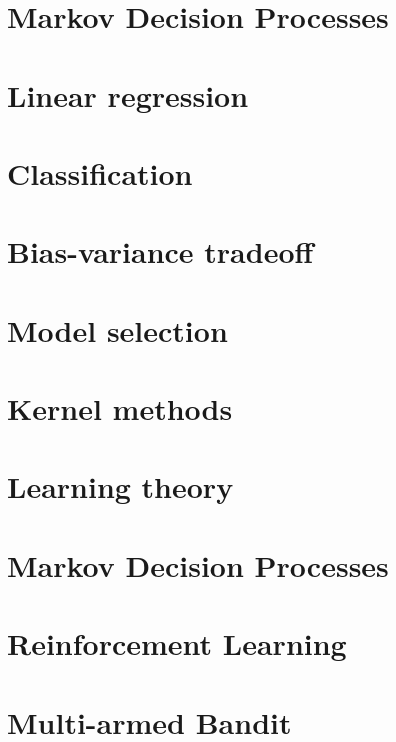 \documentclass[12pt, a4paper]{report}
\begin{document}
    \chapter{Markov Decision Processes}




    \appendix
    \chapter{Linear regression}
    
    
    

    \chapter{Classification}
    
    
    
    
    
    
    

    \chapter{Bias-variance tradeoff}
    
    
    

    \chapter{Model selection}
    
    
    

    \chapter{Kernel methods}
    
    
    

    \chapter{Learning theory}
    
    
    

    \chapter{Markov Decision Processes}
    
    
    

    \chapter{Reinforcement Learning}


    \chapter{Multi-armed Bandit}



    
\end{document}
